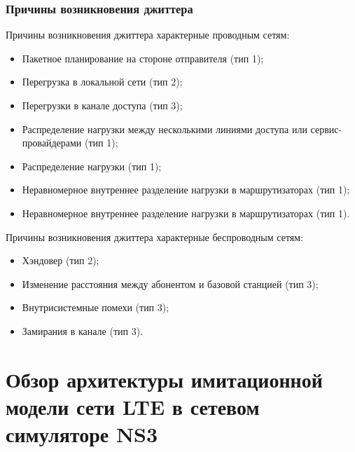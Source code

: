 \documentclass[10pt,pdf,hyperref={unicode}]{beamer}
\begin{document}
\begin{frame}
\frametitle{Причины возникновения джиттера}
{\footnotesize
\begin{exampleblock}
{Причины возникновения джиттера характерные  проводным сетям:}
\begin{itemize}
\item Пакетное планирование на стороне отправителя (тип 1);
\item Перегрузка в локальной сети (тип 2);
\item Перегрузки в канале доступа (тип 3);
\item Распределение нагрузки между несколькими линиями доступа или сервис-провайдерами (тип 1);
\item Распределение нагрузки (тип 1);
\item Неравномерное внутреннее разделение нагрузки в маршрутизаторах (тип 1);
\item Неравномерное внутреннее разделение нагрузки в маршрутизаторах (тип 1).
\end{itemize}
\end{exampleblock}

\begin{exampleblock}
{Причины возникновения джиттера характерные беспроводным сетям:}
\begin{itemize}
\item Хэндовер (тип 2);
\item Изменение расстояния между абонентом и базовой станцией (тип 3);
\item Внутрисистемные помехи (тип 3);
\item Замирания в канале (тип 3).
\end{itemize}
\end{exampleblock}
}
\end{frame}







\section{Обзор архитектуры имитационной модели сети LTE в сетевом симуляторе NS3}
\end{document}
